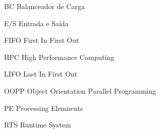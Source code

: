 \begin{siglas}
  \item [BC] Balanceador de Carga
  \item [E/S] Entrada e Saída
  \item [FIFO] First In First Out
  \item [HPC] High Performance Computing
  \item [LIFO] Last In First Out
  \item [OOPP] Object Orientation Parallel Programming
  \item [PE] Processing Elemnents
  \item [RTS] Runtime System
\end{siglas}
